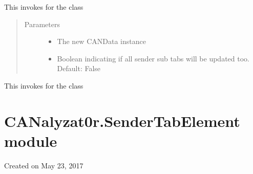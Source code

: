 \documentclass[letterpaper,10pt,english]{sphinxmanual}
\begin{document}
\begin{fulllineitems}
\begin{fulllineitems}
\begin{quote}
\begin{description}
\end{description}\end{quote}

\end{fulllineitems}


\begin{fulllineitems}
\label{\detokenize{src:src.SenderTab.SenderTab.updateCANDataInstance}}
This invokes  for the class
\begin{quote}\begin{description}
\item[{Parameters}] \leavevmode\begin{itemize}
\item {} 
 \textendash{} The new CANData instance

\item {} 
 \textendash{} Boolean indicating if all sender sub tabs will be updated too. Default: False

\end{itemize}

\end{description}\end{quote}

\end{fulllineitems}


\begin{fulllineitems}
\label{\detokenize{src:src.SenderTab.SenderTab.updateInterfaceLabel}}
This invokes  for the class

\end{fulllineitems}


\end{fulllineitems}



\section{CANalyzat0r.SenderTabElement module}
\label{\detokenize{src:module-src.SenderTabElement}}\label{\detokenize{src:canalyzat0r-sendertabelement-module}}
Created on May 23, 2017
\end{document}

